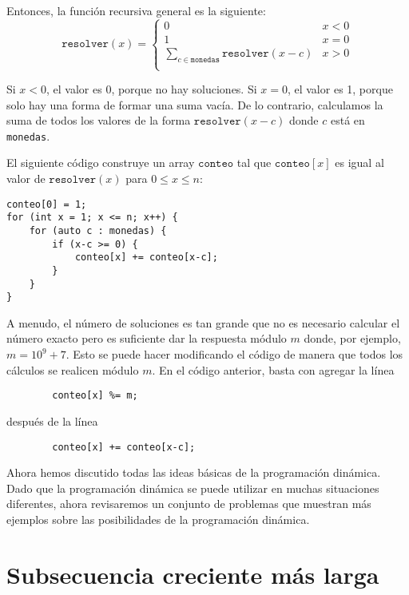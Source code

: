 Entonces, la función recursiva general es la siguiente:
\begin{equation*}
    \texttt{resolver}(x) = \begin{cases}
               0               & x < 0\\
               1               & x = 0\\
               \sum_{c \in \texttt{monedas}} \texttt{resolver}(x-c) & x > 0 \\
           \end{cases}
\end{equation*}

Si $x<0$, el valor es 0, porque no hay soluciones.
Si $x=0$, el valor es 1, porque solo hay una forma
de formar una suma vacía.
De lo contrario, calculamos la suma de todos los valores
de la forma $\texttt{resolver}(x-c)$ donde $c$ está en \texttt{monedas}.

El siguiente código construye un array
$\texttt{conteo}$ tal que
$\texttt{conteo}[x]$ es igual
al valor de $\texttt{resolver}(x)$
para $0 \le x \le n$:

\begin{lstlisting}
conteo[0] = 1;
for (int x = 1; x <= n; x++) {
    for (auto c : monedas) {
        if (x-c >= 0) {
            conteo[x] += conteo[x-c];
        }
    }
}
\end{lstlisting}

A menudo, el número de soluciones es tan grande
que no es necesario calcular el número exacto
pero es suficiente dar la respuesta módulo $m$
donde, por ejemplo, $m=10^9+7$.
Esto se puede hacer modificando el código de manera que
todos los cálculos se realicen módulo $m$.
En el código anterior, basta con agregar la línea
\begin{lstlisting}
        conteo[x] %= m;
\end{lstlisting}
después de la línea
\begin{lstlisting}
        conteo[x] += conteo[x-c];
\end{lstlisting}

Ahora hemos discutido todas las ideas básicas
de la programación dinámica.
Dado que la programación dinámica se puede utilizar
en muchas situaciones diferentes,
ahora revisaremos un conjunto de problemas
que muestran más ejemplos sobre las
posibilidades de la programación dinámica.

\section{Subsecuencia creciente más larga}

